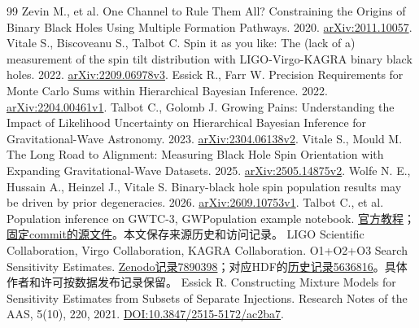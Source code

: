 \documentclass[UTF8,a4paper,11pt,fontset=fandol]{ctexart}
\begin{document}
\FloatBarrier
\begingroup\small
\setlength{\bibsep}{2pt}
\begin{thebibliography}{99}
 Zevin M., et al. One Channel to Rule Them All? Constraining the Origins of Binary Black Holes Using Multiple Formation Pathways. 2020. \href{https://arxiv.org/abs/2011.10057}{arXiv:2011.10057}.
 Vitale S., Biscoveanu S., Talbot C. Spin it as you like: The (lack of a) measurement of the spin tilt distribution with LIGO-Virgo-KAGRA binary black holes. 2022. \href{https://arxiv.org/abs/2209.06978v3}{arXiv:2209.06978v3}.
 Essick R., Farr W. Precision Requirements for Monte Carlo Sums within Hierarchical Bayesian Inference. 2022. \href{https://arxiv.org/abs/2204.00461v1}{arXiv:2204.00461v1}.
 Talbot C., Golomb J. Growing Pains: Understanding the Impact of Likelihood Uncertainty on Hierarchical Bayesian Inference for Gravitational-Wave Astronomy. 2023. \href{https://arxiv.org/html/2304.06138v2}{arXiv:2304.06138v2}.
 Vitale S., Mould M. The Long Road to Alignment: Measuring Black Hole Spin Orientation with Expanding Gravitational-Wave Datasets. 2025. \href{https://arxiv.org/html/2505.14875v2}{arXiv:2505.14875v2}.
 Wolfe N. E., Hussain A., Heinzel J., Vitale S. Binary-black hole spin population results may be driven by prior degeneracies. 2026. \href{https://arxiv.org/html/2609.10753v1}{arXiv:2609.10753v1}.
 Talbot C., et al. Population inference on GWTC-3, GWPopulation example notebook. \href{https://colmtalbot.github.io/gwpopulation/examples/GWTC3.html}{官方教程}；\href{https://github.com/ColmTalbot/gwpopulation/blob/2daa71e8c56362f2f64e2166a0055478557f239a/examples/GWTC3.ipynb}{固定commit的源文件}。本文保存来源历史和访问记录。
 LIGO Scientific Collaboration, Virgo Collaboration, KAGRA Collaboration. O1+O2+O3 Search Sensitivity Estimates. \href{https://zenodo.org/records/7890398}{Zenodo记录7890398}；对应HDF的\href{https://zenodo.org/records/5636816}{历史记录5636816}。具体作者和许可按数据发布记录保留。
 Essick R. Constructing Mixture Models for Sensitivity Estimates from Subsets of Separate Injections. Research Notes of the AAS, 5(10), 220, 2021. \href{https://doi.org/10.3847/2515-5172/ac2ba7}{DOI:10.3847/2515-5172/ac2ba7}.
\end{thebibliography}
\endgroup
\end{document}
